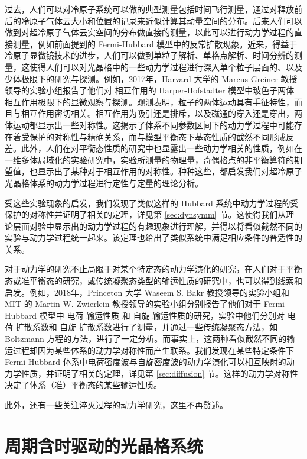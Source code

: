 过去，人们可以对冷原子系统可以做的典型测量包括时间飞行测量，通过对释放前后的冷原子气体云大小和位置的记录来近似计算其动量空间的分布。后来人们可以做到对超冷原子气体云实空间的分布做直接的测量，以此可以进行动力学过程的直接测量，例如前面提到的 Fermi-Hubbard 模型中的反常扩散现象\cite{hubbard-expan-2010,hubbard-expan-2012}。近来，得益于冷原子显微镜技术的进步，人们可以做到单粒子解析、单格点解析、时间分辨的测量，这使得人们可以对光晶格中的一些动力学过程进行深入单个粒子层面的、以及少体极限下的研究与探测。例如，2017年，Harvard 大学的 Marcus Greiner 教授领导的实验小组报告了他们对 相互作用的 Harper-Hofstadter 模型中玻色子两体相互作用极限下的显微观察与探测\cite{twobody-2017}。观测表明，粒子的两体运动具有手征特性，而且与相互作用密切相关。相互作用为吸引还是排斥，以及磁通的穿入还是穿出，两体运动都显示出一些对称性。这揭示了体系不同参数区间下的动力学过程中可能存在着受保护的对称性与精确关系，而与模型平衡态下基态性质的截然不同形成反差。此外，人们在对平衡态性质的研究中也显露出一些动力学相关的性质，例如在一维多体局域化的实验研究中\cite{mbl1d}，实验所测量的物理量，奇偶格点的非平衡算符的期望值，也显示出了某种对于相互作用的对称性。种种这些，都启发我们对超冷原子光晶格体系的动力学过程进行定性与定量的理论分析。

受这些实验现象的启发，我们发现了类似这样的 Hubbard 系统中动力学过程的受保护的对称性并证明了相关的定理\cite{dynsymm}，详见第 \ref{sec:dynsymm} 节。这使得我们从理论层面对验中显示出的动力学过程的有趣现象进行理解，并得以将看似截然不同的实验与动力学过程统一起来。该定理也给出了类似系统中满足相应条件的普适性的关系。

对于动力学的研究不止局限于对某个特定态的动力学演化的研究，在人们对于平衡态或准平衡态的研究，或传统凝聚态类型的输运性质的研究中，也可以得到线索和启发。例如，2018年，Princeton 大学 Waseem S. Bakr 教授领导的实验小组和 MIT 的 Martin W. Zwierlein 教授领导的实验小组分别报告了他们对于 Fermi-Hubbard 模型中 电荷 输运性质 和 自旋 输运性质的研究，实验中他们分别对 电荷 扩散系数和 自旋 扩散系数进行了测量，并通过一些传统凝聚态方法，如 Boltzmann 方程的方法，进行了一定分析。而事实上，这两种看似截然不同的输运过程却因为某些体系的动力学对称性而产生联系。我们发现在某些特定条件下 Fermi-Hubbard 体系中电荷密度波与自旋密度波的动力学演化可以相互映射的动力学性质，并证明了相关的定理\cite{diffusion}，详见第 \ref{sec:diffusion} 节。这样的动力学对称性决定了体系（准）平衡态的某些输运性质。

此外，还有一些关注淬灭过程的动力学研究，这里不再赘述。



\section{周期含时驱动的光晶格系统}

